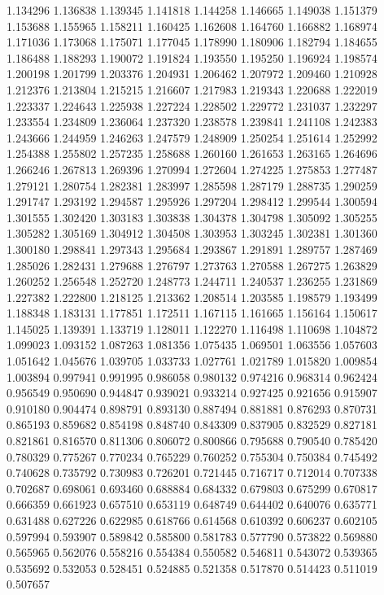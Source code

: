 1.134296
1.136838
1.139345
1.141818
1.144258
1.146665
1.149038
1.151379
1.153688
1.155965
1.158211
1.160425
1.162608
1.164760
1.166882
1.168974
1.171036
1.173068
1.175071
1.177045
1.178990
1.180906
1.182794
1.184655
1.186488
1.188293
1.190072
1.191824
1.193550
1.195250
1.196924
1.198574
1.200198
1.201799
1.203376
1.204931
1.206462
1.207972
1.209460
1.210928
1.212376
1.213804
1.215215
1.216607
1.217983
1.219343
1.220688
1.222019
1.223337
1.224643
1.225938
1.227224
1.228502
1.229772
1.231037
1.232297
1.233554
1.234809
1.236064
1.237320
1.238578
1.239841
1.241108
1.242383
1.243666
1.244959
1.246263
1.247579
1.248909
1.250254
1.251614
1.252992
1.254388
1.255802
1.257235
1.258688
1.260160
1.261653
1.263165
1.264696
1.266246
1.267813
1.269396
1.270994
1.272604
1.274225
1.275853
1.277487
1.279121
1.280754
1.282381
1.283997
1.285598
1.287179
1.288735
1.290259
1.291747
1.293192
1.294587
1.295926
1.297204
1.298412
1.299544
1.300594
1.301555
1.302420
1.303183
1.303838
1.304378
1.304798
1.305092
1.305255
1.305282
1.305169
1.304912
1.304508
1.303953
1.303245
1.302381
1.301360
1.300180
1.298841
1.297343
1.295684
1.293867
1.291891
1.289757
1.287469
1.285026
1.282431
1.279688
1.276797
1.273763
1.270588
1.267275
1.263829
1.260252
1.256548
1.252720
1.248773
1.244711
1.240537
1.236255
1.231869
1.227382
1.222800
1.218125
1.213362
1.208514
1.203585
1.198579
1.193499
1.188348
1.183131
1.177851
1.172511
1.167115
1.161665
1.156164
1.150617
1.145025
1.139391
1.133719
1.128011
1.122270
1.116498
1.110698
1.104872
1.099023
1.093152
1.087263
1.081356
1.075435
1.069501
1.063556
1.057603
1.051642
1.045676
1.039705
1.033733
1.027761
1.021789
1.015820
1.009854
1.003894
0.997941
0.991995
0.986058
0.980132
0.974216
0.968314
0.962424
0.956549
0.950690
0.944847
0.939021
0.933214
0.927425
0.921656
0.915907
0.910180
0.904474
0.898791
0.893130
0.887494
0.881881
0.876293
0.870731
0.865193
0.859682
0.854198
0.848740
0.843309
0.837905
0.832529
0.827181
0.821861
0.816570
0.811306
0.806072
0.800866
0.795688
0.790540
0.785420
0.780329
0.775267
0.770234
0.765229
0.760252
0.755304
0.750384
0.745492
0.740628
0.735792
0.730983
0.726201
0.721445
0.716717
0.712014
0.707338
0.702687
0.698061
0.693460
0.688884
0.684332
0.679803
0.675299
0.670817
0.666359
0.661923
0.657510
0.653119
0.648749
0.644402
0.640076
0.635771
0.631488
0.627226
0.622985
0.618766
0.614568
0.610392
0.606237
0.602105
0.597994
0.593907
0.589842
0.585800
0.581783
0.577790
0.573822
0.569880
0.565965
0.562076
0.558216
0.554384
0.550582
0.546811
0.543072
0.539365
0.535692
0.532053
0.528451
0.524885
0.521358
0.517870
0.514423
0.511019
0.507657
